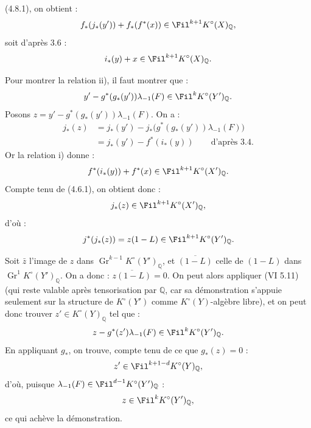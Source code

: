 (4.8.1), on obtient :
\[
  f_*(j_*(y'))+f_*(f^*(x))\in\Fil^{k+1}K^\circ(X)_{\mathbb Q},
\]
soit d'après 3.6 :
\[
  i_*(y)+x\in\Fil^{k+1}K^\circ(X)_{\mathbb Q}.
\]

Pour montrer la relation ii), il faut montrer que :
\[
  y'-g^*(g_*(y'))\lambda_{-1}(F)\in\Fil^kK^\circ(Y')_{\mathbb Q}.
\]
Posons \(z=y'-g^*(g_*(y'))\lambda_{-1}(F)\). On a :
\[
\begin{aligned}
j_*(z)
  &=j_*(y')-j_*\bigl(g^*(g_*(y'))\lambda_{-1}(F)\bigr)\\
  &=j_*(y')-f^*(i_*(y))\qquad\text{d'après 3.4.}
\end{aligned}
\]
Or la relation i) donne :
\[
  f^*(i_*(y))+f^*(x)\in\Fil^{k+1}K^\circ(X')_{\mathbb Q}.
\]
Compte tenu de (4.6.1), on obtient donc :
\[
  j_*(z)\in\Fil^{k+1}K^\circ(X')_{\mathbb Q},
\]
d'où :
\[
  j^*(j_*(z))=z(1-L)\in\Fil^{k+1}K^\circ(Y')_{\mathbb Q}.
\]

Soit \(\bar z\) l'image de \(z\) dans \(\operatorname{Gr}^{k-1}K^\circ(Y')_{\mathbb Q}\), et \(\overline{(1-L)}\) celle de \((1-L)\) dans \(\operatorname{Gr}^{1}K^\circ(Y')_{\mathbb Q}\). On a donc : \(\overline{z(1-L)}=0\). On peut alors appliquer (VI 5.11) (qui reste valable après tensorisation par \(\mathbb Q\), car sa démonstration s'appuie seulement sur la structure de \(K^\circ(Y')\) comme \(K^\circ(Y)\)-algèbre libre), et on peut donc trouver \(z'\in K^\circ(Y)_{\mathbb Q}\) tel que :
\[
  z-g^*(z')\lambda_{-1}(F)\in\Fil^kK^\circ(Y')_{\mathbb Q}.
\]
En appliquant \(g_*\), on trouve, compte tenu de ce que \(g_*(z)=0\) :
\[
  z'\in\Fil^{k+1-d}K^\circ(Y)_{\mathbb Q},
\]
d'où, puisque \(\lambda_{-1}(F)\in\Fil^{d-1}K^\circ(Y')_{\mathbb Q}\) :
\[
  z\in\Fil^kK^\circ(Y')_{\mathbb Q},
\]
ce qui achève la démonstration.

